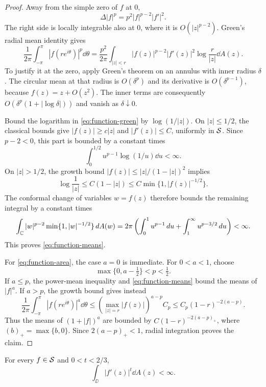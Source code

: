 \begin{proof}
 Away from the simple zero of $f$ at $0$,
 \[
  \Delta |f|^p=p^2|f|^{p-2}|f'|^2.
 \]
 The right side is locally integrable also at $0$, where it is
 $O(|z|^{p-2})$.  Green's radial mean identity gives
 \begin{equation}\label{eq:function-green}
 \frac1{2\pi}\int_{-\pi}^{\pi}|f(re^{i\theta})|^p\dd\theta
 =\frac{p^2}{2\pi}\int_{|z|<r}
   |f(z)|^{p-2}|f'(z)|^2\log\frac r{|z|}\dd A(z).
 \end{equation}
 To justify it at the zero, apply Green's theorem on an annulus
 \cite[Theorem~16.17]{Lee2013} with
 inner radius $\delta$.  The circular mean at that radius is
 $O(\delta^p)$ and its derivative is $O(\delta^{p-1})$, because
 $f(z)=z+O(z^2)$.  The inner terms are consequently
 $O(\delta^p(1+|\log\delta|))$ and vanish as $\delta\downarrow0$.

 Bound the logarithm in \eqref{eq:function-green} by
 $\log(1/|z|)$.  On $|z|\leq1/2$, the classical bounds give
 $|f(z)|\geq c|z|$ and $|f'(z)|\leq C$, uniformly in $\mathcal S$.
 Since $p-2<0$, this part is bounded by a constant times
 \[
  \int_0^{1/2}u^{p-1}\log(1/u)\dd u<\infty.
 \]
 On $|z|>1/2$, the growth bound
 $|f(z)|\leq |z|/(1-|z|)^2$ implies
 \[
  \log\frac1{|z|}
   \leq C(1-|z|)
   \leq C\min\{1,|f(z)|^{-1/2}\}.
 \]
 The conformal change of variables $w=f(z)$ therefore bounds the
 remaining integral by a constant times
 \[
  \int_{\mathbb C}|w|^{p-2}\min\{1,|w|^{-1/2}\}\,d A(w)
  =2\pi\left(\int_0^1u^{p-1}\,d u
             +\int_1^\infty u^{p-3/2}\,d u\right)<\infty.
 \]
 This proves \eqref{eq:function-means}.

 For \eqref{eq:function-area}, the case $a=0$ is immediate.
 For $0<a<1$, choose
 \[
   \max\{0,a-\tfrac12\}<p<\tfrac12.
 \]
 If $a\leq p$, the power-mean inequality and
 \eqref{eq:function-means} bound the means of $|f|^a$.
 If $a>p$, the growth bound gives instead
 \[
  \frac1{2\pi}\int_{-\pi}^{\pi}|f(re^{i\theta})|^a\dd\theta
   \leq
   \left(\max_{|z|=r}|f(z)|\right)^{a-p}C_p
   \leq C_p(1-r)^{-2(a-p)}.
 \]
 Thus the means of $(1+|f|)^a$ are bounded by
 $C(1-r)^{-2(a-p)_+}$, where $(b)_+=\max\{b,0\}$.
 Since $2(a-p)_+<1$, radial integration proves the claim.
\end{proof}

\begin{lemma}\label{lem:positive-derivative-powers}
 For every $f\in\mathcal S$ and $0<t<2/3$,
 \[
  \int_{\DD}|f'(z)|^t\dd A(z)<\infty.
 \]
\end{lemma}

